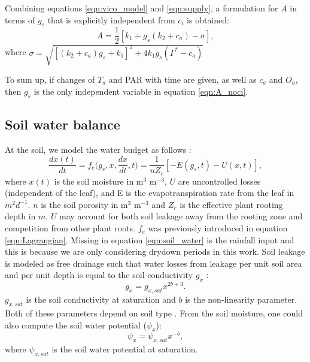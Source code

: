 \documentclass[utf8]{frontiersSCNS} %
\begin{document}
Combining equations \ref{eqn:vico_model} and \ref{eqn:supply}, a formulation for $A$ in terms of $g_s$ that is explicitly independent from $c_i$ is obtained:
\begin{equation}
    \label{eqn:A_noci}
    A = \frac{1}{2}[k_1 + g_s(k_2 + c_a) - \sigma],
\end{equation}
where $\sigma = \sqrt{[(k_2 + c_a)g_s + k_1]^2 + 4k_1 g_s (\Gamma^*-c_a)}$

To sum up, if changes of $T_a$ and PAR with time are given, as well as $c_a$ and $O_a$, then $g_s$ is the only independent variable in equation \ref{eqn:A_noci}.

\subsection{Soil water balance}


At the soil, we model the water budget as follows \citep{Rodriguez-Iturbe2007}:
\begin{equation}
    \label{eqn:soil_water}
    \frac{dx(t)}{dt} = f_e\Big(g_s, x, \frac{dx}{dt}, t\Big) = \frac{1}{n Z_r}[- E(g_s, t) - U(x, t)],
\end{equation}
where $x(t)$ is the soil moisture in m$^3$ m$^{-3}$, $U$ are uncontrolled losses (independent of the leaf), and E is the evapotranspiration rate from the leaf in $m^2d^{-1}$. $n$ is the soil porosity in m$^3$ m$^{-3}$ and $Z_r$ is the effective plant rooting depth in $m$. $U$ may account for both soil leakage away from the rooting zone and competition from other plant roots. $f_e$ was previously introduced in equation \ref{eqn:Lagrangian}. Missing in equation \ref{eqn:soil_water} is the rainfall input and this is because we are only considering drydown periods in this work. Soil leakage is modeled as free drainage such that water losses from leakage per unit soil area and per unit depth is equal to the soil conductivity $g_x$ \citep{campbell1974}:
\begin{equation}
    \label{eqn:soil_cond}
    g_x = g_{x,sat}x^{2b+3}.
\end{equation}
$g_{x,sat}$ is the soil conductivity at saturation and $b$ is the non-linearity parameter. Both of these parameters depend on soil type \citep{Clapp1978}. From the soil moisture, one could also compute the soil water potential ($\psi_x$):
\begin{equation}
    \label{eqn:Clapp_pot}
    \psi_x = \psi_{x,sat}x^{-b},
\end{equation}
where $\psi_{x,sat}$ is the soil water potential at saturation.
\end{document}
